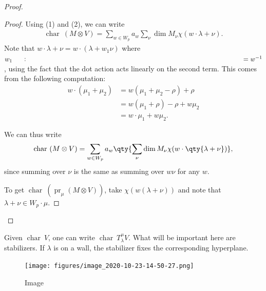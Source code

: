 \begin{proof}

\begin{proof}

Using (1) and (2), we can write
\begin{align*}   \operatorname{char}~(M\otimes V) =  \sum_{w\in W_p} a_w \sum_\nu \dim M_\nu \chi(w\cdot \lambda + \nu) .\end{align*}
Note that \(w\cdot \lambda + \nu = w\cdot (\lambda + w_1 \nu)\) where
\(w_1 \mathrel{\vcenter{:}}= w^{-1}\), using the fact that the dot
action acts linearly on the second term. This comes from the following
computation:
\begin{align*}   w\cdot(\mu_1 + \mu_2) &= w(\mu_1 + \mu_2 - \rho) + \rho \\ &= w(\mu_1 + \rho) - \rho + w\mu_2 \\ &= w\cdot \mu_1 + w\mu_2 .\end{align*}

We can thus write
\begin{align*}   \operatorname{char}~(M\otimes V) =  \sum_{w\in W_p} a_w \qty{ \sum_\nu \dim M_\nu \chi(w\cdot \qty{\lambda + \nu})} ,\end{align*}
since summing over \(\nu\) is the same as summing over \(w\nu\) for any
\(w\).

To get \(\operatorname{char}~({\operatorname{pr}}_\mu(M\otimes V))\),
take \(\chi(w(\lambda + \nu))\) and note that
\(\lambda + \nu \in W_p \cdot \mu\).

\end{proof}

\end{proof}

\begin{remark}

\begin{remark}

Given \(\operatorname{char}~V\), one can write
\(\operatorname{char}~T_\lambda^\mu V\). What will be important here are
stabilizers. If \(\lambda\) is on a wall, the stabilizer fixes the
corresponding hyperplane.

\begin{figure}
\centering
\texttt{[image: figures/image\_2020-10-23-14-50-27.png]}
\caption{Image}
\end{figure}

\end{remark}

\end{remark}

